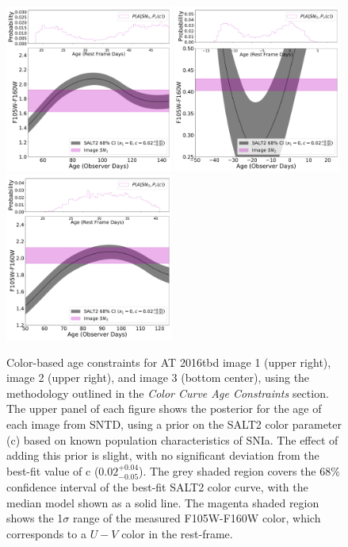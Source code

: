 \documentclass[12pt]{article}
\def\SNABC{AT 2016tbd\xspace}
\begin{document}
{\begin{figure}
    \centering
    \includegraphics[width=0.49\textwidth]{Paper/Figures/colorcurve_image1.pdf}
    \includegraphics[width=0.49\textwidth]{Paper/Figures/colorcurve_image2.pdf}
    \includegraphics[width=0.49\textwidth]{Paper/Figures/colorcurve_image3.pdf}
    \caption{Color-based age constraints for \SNABC image 1 (upper right), image 2 (upper right), and image 3 (bottom center), using the methodology outlined in the \textit{Color Curve Age Constraints} section. The upper panel of each figure shows the posterior for the age of each image from SNTD, using a prior on the SALT2 color parameter (c) based on known population characteristics of SNIa. The effect of adding this prior is slight, with no significant deviation from the best-fit value of c ($0.02^{+0.04}_{-0.05}$). The grey shaded region covers the 68\% confidence interval of the best-fit SALT2 color curve, with the median model shown as a solid line. The magenta shaded region shows the 1$\sigma$ range of the measured F105W-F160W color, which corresponds to a $U-V$ color in the rest-frame.}
    \label{fig:colorcurves}
\end{figure}



}
\end{document}
